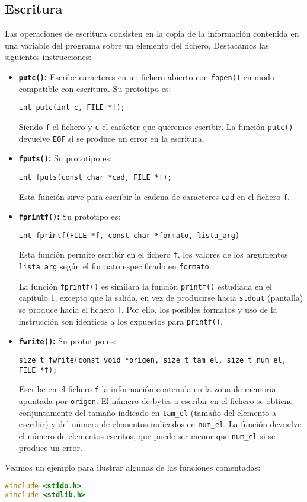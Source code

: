 \subsection{Escritura}{
Las operaciones de escritura consisten en la copia de la información contenida en una variable del programa sobre un elemento del fichero. Destacamos las siguientes instrucciones:
\begin{itemize}
	\item \textbf{\texttt{putc()}:} Escribe caracteres en un fichero abierto con \texttt{fopen()} en modo compatible con escritura. Su prototipo es:
	
	\texttt{int putc(int c, FILE *f);}
	
	Siendo \texttt{f} el fichero y \texttt{c} el carácter que queremos escribir. La función \texttt{putc()} devuelve \texttt{EOF} si se produce un error en la escritura.
	
	\item \textbf{\texttt{fputs()}:} Su prototipo es:
	
	\texttt{int fputs(const char *cad, FILE *f);}
	
	Esta función sirve para escribir la cadena de caracteres \texttt{cad} en el fichero \texttt{f}.
	
	\item \textbf{\texttt{fprintf()}:} Su prototipo es:
	
	\texttt{int fprintf(FILE *f, const char *formato, lista\_arg)}
	
	Esta función permite escribir en el fichero \texttt{f}, los valores de los argumentos \texttt{lista\_arg} según el formato especificado en \texttt{formato}.
	
	La función \texttt{fprintf()} es similara la función \texttt{printf()} estudiada en el capítulo 1, excepto que la salida, en vez de producirse hacia \texttt{stdout} (pantalla) se produce hacia el fichero \texttt{f}. Por ello, los posibles formatos y uso de la instrucción son idénticos a los expuestos para \texttt{printf()}.
	
	\item \textbf{\texttt{fwrite()}:} Su prototipo es:
	
	\texttt{size\_t fwrite(const void *origen, size\_t tam\_el, size\_t num\_el, FILE *f);}
	
	Escribe en el fichero \texttt{f} la información contenida en la zona de memoria apuntada por \texttt{origen}. El número de bytes a escribir en el fichero se obtiene conjuntamente del tamaño indicado en \texttt{tam\_el} (tamaño del elemento a escribir) y del número de elementos indicados en \texttt{num\_el}. La función devuelve el número de elementos escritos, que puede ser menor que \texttt{num\_el} si se produce un error.
\end{itemize}
Veamos un ejemplo para ilustrar algunas de las funciones comentadas:
\begin{Ejemplo}
\begin{lstlisting}[language=C]
#include <stido.h>
#include <stdlib.h>


\end{lstlisting}
\end{Ejemplo}}
